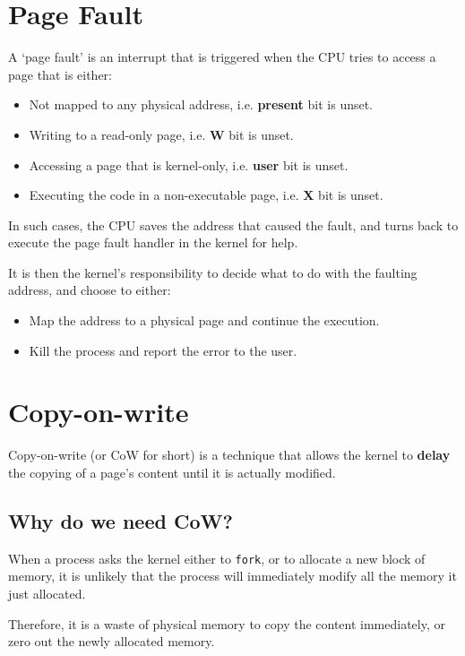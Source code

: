 \section{Page Fault}

A `page fault' is an interrupt that is triggered when the CPU tries to access a
page that is either:

\begin{itemize}
    \item Not mapped to any physical address, i.e. \textbf{present} bit is unset.
    \item Writing to a read-only page, i.e. \textbf{W} bit is unset.
    \item Accessing a page that is kernel-only, i.e. \textbf{user} bit is unset.
    \item Executing the code in a non-executable page, i.e. \textbf{X} bit is unset.
\end{itemize}

In such cases, the CPU saves the address that caused the fault, and turns back
to execute the page fault handler in the kernel for help.

It is then the kernel's responsibility to decide what to do with the faulting
address, and choose to either:

\begin{itemize}
    \item Map the address to a physical page and continue the execution.
    \item Kill the process and report the error to the user.
\end{itemize}

\section{Copy-on-write}

Copy-on-write (or CoW for short) is a technique that allows the kernel to
\textbf{delay} the copying of a page's content until it is actually modified.

\subsection{Why do we need CoW?}

When a process asks the kernel either to \texttt{fork}, or to allocate
a new block of memory, it is unlikely that the process will immediately
modify all the memory it just allocated.

Therefore, it is a waste of physical memory to copy the content
immediately, or zero out the newly allocated memory.

